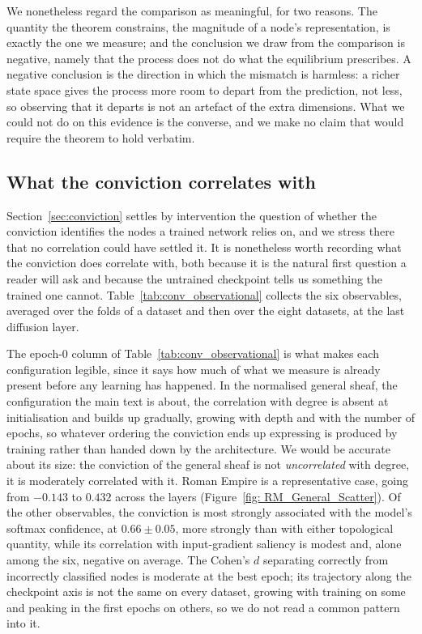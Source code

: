 We nonetheless regard the comparison as meaningful, for two reasons. The
quantity the theorem constrains, the magnitude of a node's representation, is
exactly the one we measure; and the conclusion we draw from the comparison is
negative, namely that the process does not do what the equilibrium prescribes.
A negative conclusion is the direction in which the mismatch is harmless: a
richer state space gives the process more room to depart from the prediction,
not less, so observing that it departs is not an artefact of the extra
dimensions. What we could not do on this evidence is the converse, and we make
no claim that would require the theorem to hold verbatim.

\subsection{What the conviction correlates with}
\label{sec:supp_conv_observational}

Section~\ref{sec:conviction} settles by intervention the question of whether the
conviction identifies the nodes a trained network relies on, and we stress there
that no correlation could have settled it. It is nonetheless worth recording
what the conviction does correlate with, both because it is the natural first
question a reader will ask and because the untrained checkpoint tells us
something the trained one cannot. Table~\ref{tab:conv_observational} collects
the six observables, averaged over the folds of a dataset and then over the
eight datasets, at the last diffusion layer.

The epoch-$0$ column of Table~\ref{tab:conv_observational} is what makes each
configuration legible, since it says how
much of what we measure is already present before any learning has happened. In
the normalised general sheaf, the configuration the main text is about, the
correlation with degree is absent at initialisation and builds up gradually,
growing with depth and with the number of epochs, so whatever ordering the
conviction ends up expressing is produced by training rather than handed down by
the architecture. We would be accurate about its size: the conviction of the
general sheaf is not \emph{uncorrelated} with degree, it is moderately
correlated with it. Roman Empire is a representative case, going from $-0.143$
to $0.432$ across the layers (Figure~\ref{fig: RM_General_Scatter}). Of the
other observables, the conviction is most strongly associated with the model's
softmax confidence, at $0.66 \pm 0.05$, more strongly than with either
topological quantity, while its correlation with input-gradient saliency is
modest and, alone among the six, negative on average. The Cohen's $d$ separating correctly from
incorrectly classified nodes is moderate at the best epoch; its trajectory along
the checkpoint axis is not the same on every dataset, growing with training on
some and peaking in the first epochs on others, so we do not read a common
pattern into it.

